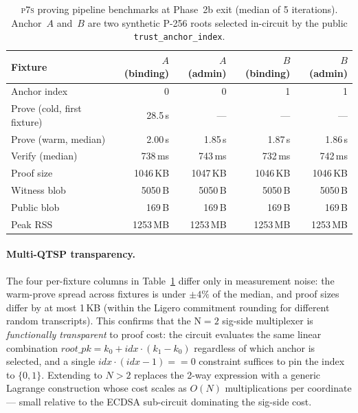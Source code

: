 \begin{table}[t]
  \centering
  \caption{\textsc{p7s} proving pipeline benchmarks at Phase~2b exit (median of 5 iterations).
           Anchor~$A$ and~$B$ are two synthetic P-256 roots selected in-circuit by the public \texttt{trust\_anchor\_index}.}\label{tab:p7s-bench}
  \begin{tabular}{lrrrr}
    \toprule
    Fixture & $A$ (binding) & $A$ (admin) & $B$ (binding) & $B$ (admin) \\
    \midrule
    Anchor index                 & 0          & 0          & 1          & 1          \\
    Prove (cold, first fixture)  & 28.5\,s    & ---        & ---        & ---        \\
    Prove (warm, median)         & 2.00\,s    & 1.85\,s    & 1.87\,s    & 1.86\,s    \\
    Verify (median)              & 738\,ms    & 743\,ms    & 732\,ms    & 742\,ms    \\
    Proof size                   & 1046\,KB   & 1047\,KB   & 1046\,KB   & 1046\,KB   \\
    Witness blob                 & 5050\,B    & 5050\,B    & 5050\,B    & 5050\,B    \\
    Public blob                  & 169\,B     & 169\,B     & 169\,B     & 169\,B     \\
    Peak RSS                     & 1253\,MB   & 1253\,MB   & 1253\,MB   & 1253\,MB   \\
    \bottomrule
  \end{tabular}
\end{table}

\paragraph{Multi-QTSP transparency.}
The four per-fixture columns in Table~\ref{tab:p7s-bench} differ only in measurement noise: the warm-prove spread across fixtures is under $\pm 4\%$ of the median, and proof sizes differ by at most 1\,KB (within the Ligero commitment rounding for different random transcripts).
This confirms that the N${=}2$ sig-side multiplexer is \emph{functionally transparent} to proof cost: the circuit evaluates the same linear combination $\textit{root\_pk} = k_0 + \textit{idx} \cdot (k_1 - k_0)$ regardless of which anchor is selected, and a single $\textit{idx} \cdot (\textit{idx} - 1) == 0$ constraint suffices to pin the index to $\{0, 1\}$.
Extending to $N{>}2$ replaces the 2-way expression with a generic Lagrange construction whose cost scales as $O(N)$ multiplications per coordinate --- small relative to the ECDSA sub-circuit dominating the sig-side cost.

